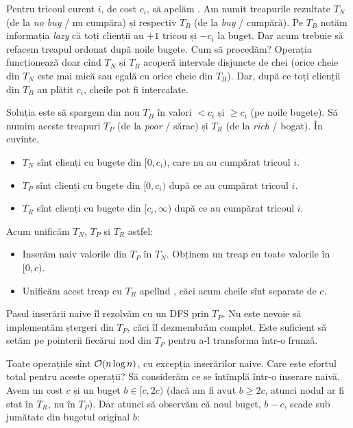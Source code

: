 \documentclass[../main.tex]{subfiles}
\begin{document}
Pentru tricoul curent $i$, de cost $c_i$, să apelăm . Am numit treapurile rezultate $T_N$ (de la \textit{no buy} / nu cumpăra) și respectiv $T_B$ (de la \textit{buy} / cumpără). Pe $T_B$ notăm informația \textit{lazy} că toți clienții au $+1$ tricou și $-c_i$ la buget. Dar acum trebuie să refacem treapul ordonat după noile bugete. Cum să procedăm? Operația  funcționează doar cînd $T_N$ și $T_B$ acoperă intervale disjuncte de chei (orice cheie din $T_N$ este mai mică sau egală cu orice cheie din $T_B$). Dar, după ce toți clienții din $T_B$ au plătit $c_i$, cheile pot fi intercalate.

Soluția este să spargem din nou $T_B$ în valori $<c_i$ și $\geq c_i$ (pe noile bugete). Să numim aceste treapuri $T_P$ (de la \textit{poor} / sărac) și $T_R$ (de la \textit{rich} / bogat). În cuvinte,

\begin{itemize}
  \item $T_N$ sînt clienți cu bugete din $[0,c_i)$, care nu au cumpărat tricoul $i$.
  \item $T_P$ sînt clienți cu bugete din $[0,c_i)$ după ce au cumpărat tricoul $i$.
  \item $T_R$ sînt clienți cu bugete din $[c_i,\infty)$ după ce au cumpărat tricoul $i$.
\end{itemize}

Acum unificăm $T_N$, $T_P$ și $T_R$ astfel:

\begin{itemize}
  \item Inserăm naiv valorile din $T_P$ în $T_N$. Obținem un treap cu toate valorile în $[0, c)$.
  \item Unificăm acest treap cu $T_R$ apelînd , căci acum cheile sînt separate de $c$.
\end{itemize}

Pasul  inserării naive îl rezolvăm cu un DFS prin $T_P$. Nu este nevoie să implementăm ștergeri din $T_P$, căci îl dezmembrăm complet. Este suficient să setăm pe  pointerii fiecărui nod din $T_P$ pentru a-l transforma într-o frunză.

Toate operațiile sînt $\mathcal{O}(n \log n)$, cu excepția inserărilor naive. Care este efortul total pentru aceste operații? Să considerăm ce se întîmplă într-o inserare naivă. Avem un cost $c$ și un buget $b \in [c, 2c)$ (dacă am fi avut $b \geq 2c$, atunci nodul ar fi stat în $T_R$, nu în $T_P$). Dar atunci să observăm că noul buget, $b-c$, scade sub jumătate din bugetul original $b$:
\end{document}
